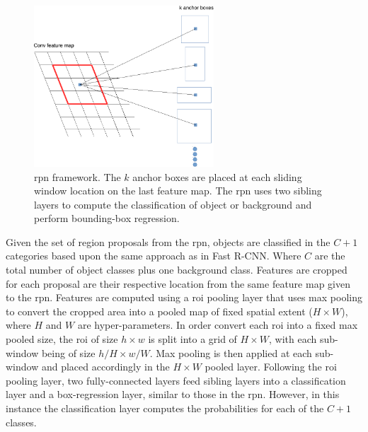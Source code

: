 \begin{figure}[H]
  \centering
    \includegraphics[width=0.6\textwidth]{Figs/Techanal/rpn1-crop.pdf}
      \caption{\gls{rpn} framework. The $k$ anchor boxes are placed at each sliding window location on the last feature map. The \gls{rpn} uses two sibling layers to compute the classification of object or background and perform bounding-box regression.}
    \label{fig:rpnframework}
\end{figure}

Given the set of region proposals from the \gls{rpn}, objects are classified in the $C+1$ categories based upon the same approach as in Fast R-CNN. Where $C$ are the total number of object classes plus one background class. Features are cropped for each proposal are their respective location from the same feature map given to the \gls{rpn}. Features are computed using a \gls{roi} pooling layer that uses max pooling to convert the cropped area into a pooled map of fixed spatial extent ($H \times W$), where $H$ and $W$ are hyper-parameters. In order convert each \gls{roi} into a fixed max pooled size, the \gls{roi} of size $h \times w$ is split into a grid of $H \times W$, with each sub-window being of size $h/H \times w/W$. Max pooling is then applied at each sub-window and placed accordingly in the $H \times W$ pooled layer. Following the \gls{roi} pooling layer, two fully-connected layers feed sibling layers into a classification layer and a box-regression layer, similar to those in the \gls{rpn}. However, in this instance the classification layer computes the probabilities for each of the $C+1$ classes.

